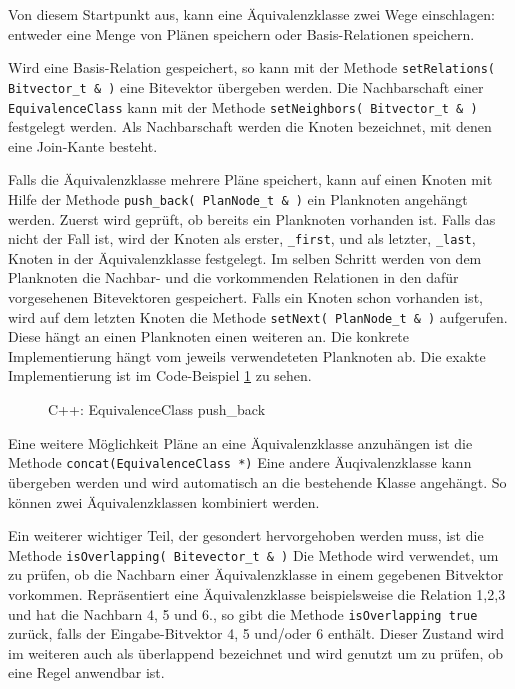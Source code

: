 Von diesem Startpunkt aus, kann eine Äquivalenzklasse zwei Wege einschlagen: entweder eine Menge von Plänen speichern oder Basis-Relationen speichern. 

Wird eine Basis-Relation gespeichert, so kann mit der Methode \texttt{setRelations( Bitvector\_t \& )} eine Bitevektor übergeben werden. Die Nachbarschaft einer \texttt{Equi\-valence\-Class} kann mit der Methode \texttt{set\-Neighbors( Bitvector\_t \& )} festgelegt werden. Als Nachbarschaft werden die Knoten bezeichnet, mit denen eine Join-Kante besteht.




Falls die Äquivalenzklasse mehrere Pläne speichert, kann auf einen Knoten mit Hilfe der Methode \texttt{push\_back( PlanNode\_t \& )} ein Planknoten angehängt werden. Zuerst wird geprüft, ob bereits ein Planknoten vorhanden ist. Falls das nicht der Fall ist, wird der Knoten als erster, \texttt{\_first}, und als letzter, \texttt{\_last}, Knoten in der Äquivalenzklasse festgelegt. Im selben Schritt werden von dem Planknoten die Nachbar- und die vorkommenden Relationen in den dafür vorgesehenen Bitevektoren gespeichert. Falls ein Knoten schon vorhanden ist, wird auf dem letzten Knoten die Methode \texttt{setNext( PlanNode\_t \& )} aufgerufen. Diese hängt an einen Planknoten einen weiteren an. Die konkrete Implementierung hängt vom jeweils verwendeteten Planknoten ab. Die exakte Implementierung ist im Code-Beispiel \ref{listing:Push-Back} zu sehen.


\begin{figure}[ht]

\caption{C++: EquivalenceClass push\_back}
\label{listing:Push-Back}
\end{figure}


Eine weitere Möglichkeit Pläne an eine Äquivalenzklasse anzuhängen ist die Methode \texttt{concat(EquivalenceClass *)} Eine andere Äuqivalenzklasse kann übergeben werden und wird automatisch an die bestehende Klasse angehängt. So können zwei Äquivalenzklassen kombiniert werden.



Ein weiterer wichtiger Teil, der gesondert hervorgehoben werden muss, ist die Methode \texttt{isOverlapping( Bitevector\_t \& )} Die Methode wird  verwendet, um zu prüfen, ob die Nachbarn einer Äquivalenzklasse in einem gegebenen Bitvektor vorkommen. Repräsentiert eine Äquivalenzklasse beispielsweise die Relation 1,2,3 und hat die Nachbarn 4, 5 und 6., so gibt die Methode \texttt{isOverlapping true} zurück, falls der Eingabe-Bitvektor 4, 5 und/oder 6 enthält. Dieser Zustand wird im weiteren auch als überlappend bezeichnet und wird genutzt um zu prüfen, ob eine Regel anwendbar ist.


